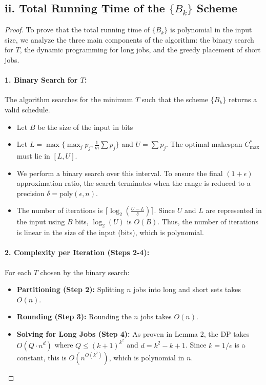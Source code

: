 \subsection*{ii. Total Running Time of the $\{B_k\}$ Scheme}

\begin{proof}
To prove that the total running time of $\{B_k\}$ is polynomial in the input size, we analyze the three main components of the algorithm: the binary search for $T$, the dynamic programming for long jobs, and the greedy placement of short jobs.

\paragraph{1. Binary Search for $T$:}
The algorithm searches for the minimum $T$ such that the scheme $\{B_k\}$ returns a valid schedule. 
\begin{itemize}
    \item Let $B$ be the size of the input in bits
    \item Let $L = \max \{ \max_j p_j, \frac{1}{m} \sum p_j \}$ and $U = \sum p_j$. The optimal makespan $C_{\max}^*$ must lie in $[L, U]$.
    \item We perform a binary search over this interval. To ensure the final $(1+\epsilon)$ approximation ratio, the search terminates when the range is reduced to a precision $\delta = \text{poly}(\epsilon, n)$.
    \item The number of iterations is $\lceil \log_2(\frac{U-L}{\delta}) \rceil$. Since $U$ and $L$ are represented in the input using $B$ bits, $\log_2(U)$ is $O(B)$. Thus, the number of iterations is linear in the size of the input (bits), which is polynomial.
\end{itemize}

\paragraph{2. Complexity per Iteration (Steps 2-4):}
For each $T$ chosen by the binary search:
\begin{itemize}
    \item \textbf{Partitioning (Step 2):} Splitting $n$ jobs into long and short sets takes $O(n)$.
    \item \textbf{Rounding (Step 3):} Rounding the $n$ jobs takes $O(n)$.
    \item \textbf{Solving for Long Jobs (Step 4):} As proven in Lemma 2, the DP takes $O(Q \cdot n^d)$ where $Q \le (k+1)^{k^2}$ and $d = k^2-k+1$. Since $k = 1/\epsilon$ is a constant, this is $O(n^{O(k^2)})$, which is polynomial in $n$.
\end{itemize}


\end{proof}
